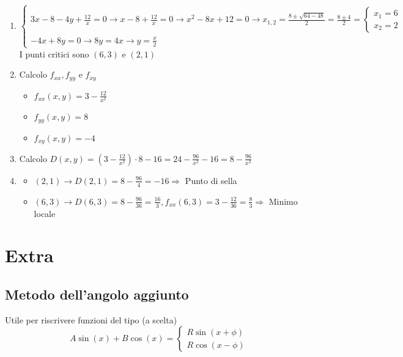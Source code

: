 \documentclass[10pt, a4paper]{article}
\begin{document}
\begin{enumerate}
\begin{enumerate}
            \item \begin{equation*}
                \begin{cases}
                    3x-8-4y+\frac{12}{x}=0 \rightarrow x-8+\frac{12}{x}=0\rightarrow x^2-8x+12=0\rightarrow x_{1,2}=\frac{8\pm\sqrt{64-48}}{2}=\frac{8\pm 4}{2}=\begin{cases}
                        x_1=6\\
                        x_2=2
                    \end{cases}\\
                    -4x+8y=0 \rightarrow 8y=4x \rightarrow y=\frac{x}{2}
                \end{cases}
            \end{equation*}
            I punti critici sono $(6,3)$ e $(2,1)$
            \item Calcolo $f_{xx}, f_{yy} \text{ e } f_{xy}$ \begin{itemize}
                \item $f_{xx}(x,y)=3-\frac{12}{x^2}$
                \item $f_{yy}(x,y)=8$
                \item $f_{xy}(x,y)=-4$
            \end{itemize}
            \item Calcolo $D(x,y)=\left(3-\frac{12}{x^2}\right)\cdot 8-16=24-\frac{96}{x^2}-16=8-\frac{96}{x^2}$
            \item \begin{itemize}
                \item $(2,1)\rightarrow D(2,1)=8-\frac{96}{4}=-16 \Rightarrow$ Punto di sella
                \item $(6,3)\rightarrow D(6,3)=8-\frac{96}{36}=\frac{16}{3}, f_{xx}(6,3)=3-\frac{12}{36}=\frac{8}{3}\Rightarrow$ Minimo locale
            \end{itemize}
        \end{enumerate}
    \end{enumerate}
\section{Extra}
    \subsection{Metodo dell'angolo aggiunto}
        Utile per riscrivere funzioni del tipo (a scelta)
        \begin{equation*}
            A\sin(x)+B\cos(x)=\begin{cases}
                R\sin(x+\phi)\\
                R\cos(x-\phi)
            \end{cases}
        \end{equation*}
\end{document}
